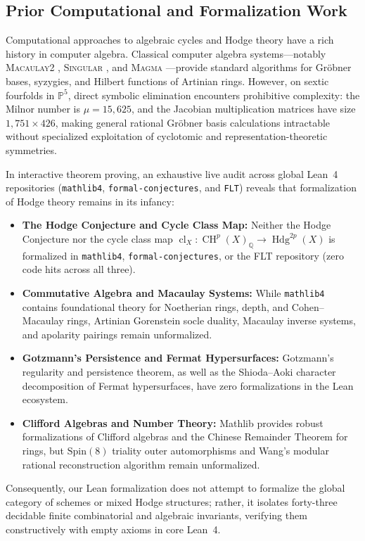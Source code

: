 \documentclass[11pt,a4paper]{amsart}
\theoremstyle{definition}
\theoremstyle{remark}
\DeclareMathOperator{\Hdg}{Hdg}
\DeclareMathOperator{\CH}{CH}
\DeclareMathOperator{\cl}{cl}
\begin{document}
\subsection{Prior Computational and Formalization Work}
Computational approaches to algebraic cycles and Hodge theory have a rich history in computer algebra. Classical computer algebra systems---notably \textsc{Macaulay2} \cite{GraysonStillman}, \textsc{Singular} \cite{DGPS}, and \textsc{Magma} \cite{BosmaCannonPlayoust}---provide standard algorithms for Gr{\"o}bner bases, syzygies, and Hilbert functions of Artinian rings. However, on sextic fourfolds in $\mathbb{P}^5$, direct symbolic elimination encounters prohibitive complexity: the Milnor number is $\mu = 15,625$, and the Jacobian multiplication matrices have size $1,751 \times 426$, making general rational Gr{\"o}bner basis calculations intractable without specialized exploitation of cyclotomic and representation-theoretic symmetries.

In interactive theorem proving, an exhaustive live audit across global Lean~4 repositories (\texttt{mathlib4}, \texttt{formal-conjectures}, and \texttt{FLT}) reveals that formalization of Hodge theory remains in its infancy:
\begin{itemize}[leftmargin=1.5em]
\item \textbf{The Hodge Conjecture and Cycle Class Map:} Neither the Hodge Conjecture nor the cycle class map $\cl_X : \CH^p(X)_{\mathbb{Q}} \to \Hdg^{2p}(X)$ is formalized in \texttt{mathlib4}, \texttt{formal-conjectures}, or the FLT repository (zero code hits across all three).
\item \textbf{Commutative Algebra and Macaulay Systems:} While \texttt{mathlib4} contains foundational theory for Noetherian rings, depth, and Cohen--Macaulay rings, Artinian Gorenstein socle duality, Macaulay inverse systems, and apolarity pairings remain unformalized.
\item \textbf{Gotzmann's Persistence and Fermat Hypersurfaces:} Gotzmann's regularity and persistence theorem, as well as the Shioda--Aoki character decomposition of Fermat hypersurfaces, have zero formalizations in the Lean ecosystem.
\item \textbf{Clifford Algebras and Number Theory:} Mathlib provides robust formalizations of Clifford algebras and the Chinese Remainder Theorem for rings, but $\mathrm{Spin}(8)$ triality outer automorphisms and Wang's modular rational reconstruction algorithm remain unformalized.
\end{itemize}
Consequently, our Lean formalization does not attempt to formalize the global category of schemes or mixed Hodge structures; rather, it isolates forty-three decidable finite combinatorial and algebraic invariants, verifying them constructively with empty axioms in core Lean~4.
\end{document}
